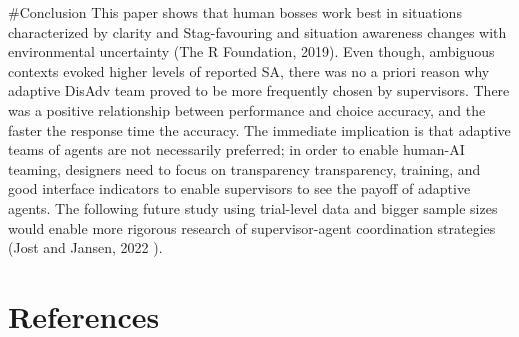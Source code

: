 \documentclass[
]{article}
\begin{document}
\#Conclusion This paper shows that human bosses work best in situations
characterized by clarity and Stag-favouring and situation awareness
changes with environmental uncertainty (The R Foundation, 2019). Even
though, ambiguous contexts evoked higher levels of reported SA, there
was no a priori reason why adaptive DisAdv team proved to be more
frequently chosen by supervisors. There was a positive relationship
between performance and choice accuracy, and the faster the response
time the accuracy. The immediate implication is that adaptive teams of
agents are not necessarily preferred; in order to enable human-AI
teaming, designers need to focus on transparency transparency, training,
and good interface indicators to enable supervisors to see the payoff of
adaptive agents. The following future study using trial-level data and
bigger sample sizes would enable more rigorous research of
supervisor-agent coordination strategies (Jost and Jansen, 2022 ).

\section{References}\label{references}
\end{document}
